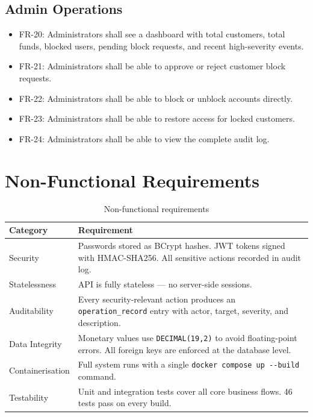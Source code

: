 \documentclass[12pt,a4paper]{report}
\begin{document}
\subsection{Admin Operations}
\begin{itemize}[noitemsep]
  \item FR-20: Administrators shall see a dashboard with total customers, total funds,
               blocked users, pending block requests, and recent high-severity events.
  \item FR-21: Administrators shall be able to approve or reject customer block requests.
  \item FR-22: Administrators shall be able to block or unblock accounts directly.
  \item FR-23: Administrators shall be able to restore access for locked customers.
  \item FR-24: Administrators shall be able to view the complete audit log.
\end{itemize}

\section{Non-Functional Requirements}

\begin{table}[H]
  \centering
  \caption{Non-functional requirements}
  \label{tab:nfr}
  \begin{tabular}{lp{9cm}}
    \toprule
    \textbf{Category} & \textbf{Requirement} \\
    \midrule
    Security      & Passwords stored as BCrypt hashes. JWT tokens signed with
                    HMAC-SHA256. All sensitive actions recorded in audit log. \\
    Statelessness & API is fully stateless — no server-side sessions. \\
    Auditability  & Every security-relevant action produces an \texttt{operation\_record}
                    entry with actor, target, severity, and description. \\
    Data Integrity& Monetary values use \texttt{DECIMAL(19,2)} to avoid floating-point
                    errors. All foreign keys are enforced at the database level. \\
    Containerisation & Full system runs with a single \texttt{docker compose up -{}-build}
                    command. \\
    Testability   & Unit and integration tests cover all core business flows.
                    46 tests pass on every build. \\
    \bottomrule
  \end{tabular}
\end{table}
\end{document}
